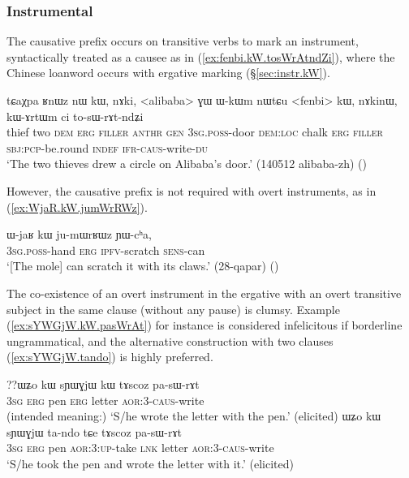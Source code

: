 \subsubsection{Instrumental} \label{sec:sig.caus.instrumental}
The causative prefix occurs on transitive verbs to mark an instrument, syntactically treated as a causee as in (\ref{ex:fenbi.kW.tosWrAtndZi}), where the Chinese loanword  occurs with ergative marking (§\ref{sec:instr.kW}). 

\begin{exe}
\ex \label{ex:fenbi.kW.tosWrAtndZi}
\gll tɕaχpa ʁnɯz nɯ kɯ, nɤki, <alibaba> ɣɯ ɯ-kɯm nɯtɕu <fenbi> kɯ, nɤkinɯ, kɯ-ɤrtɯm ci to-sɯ-rɤt-ndʑi \\
thief two \textsc{dem} \textsc{erg} \textsc{filler}  \textsc{anthr} \textsc{gen} \textsc{3sg}.\textsc{poss}-door \textsc{dem}:\textsc{loc} chalk \textsc{erg} \textsc{filler} \textsc{sbj}:\textsc{pcp}-be.round \textsc{indef} \textsc{ifr}-\textsc{caus}-write-\textsc{du} \\
\glt `The two thieves drew a circle on Alibaba's door.' (140512 alibaba-zh)
()
\end{exe}

However, the causative prefix is not required with overt instruments, as in (\ref{ex:WjaR.kW.jumWrRWz}).

\begin{exe}
\ex \label{ex:WjaR.kW.jumWrRWz}
\gll ɯ-jaʁ kɯ ju-mɯrʁɯz ɲɯ-cʰa, \\
\textsc{3sg}.\textsc{poss}-hand \textsc{erg} \textsc{ipfv}-scratch \textsc{sens}-can \\
\glt `[The mole] can scratch it with its claws.' (28-qapar)
()
\end{exe}

The co-existence of an overt instrument in the ergative with an overt transitive subject in the same clause (without any pause) is clumsy. Example (\ref{ex:sYWGjW.kW.pasWrAt}) for instance is considered infelicitous if borderline ungrammatical, and the alternative construction with two clauses (\ref{ex:sYWGjW.tando}) is highly preferred.

\begin{exe}
\ex 
\begin{xlist}
\ex \label{ex:sYWGjW.kW.pasWrAt}
\gll ??ɯʑo kɯ sɲɯɣjɯ kɯ tɤscoz pa-sɯ-rɤt \\
\textsc{3sg} \textsc{erg} pen \textsc{erg} letter \textsc{aor}:3\flobv{}-\textsc{caus}-write \\
\glt (intended meaning:) `S/he wrote the letter with the pen.' (elicited)
\ex \label{ex:sYWGjW.tando}
\gll ɯʑo kɯ sɲɯɣjɯ ta-ndo tɕe tɤscoz pa-sɯ-rɤt\\
\textsc{3sg} \textsc{erg} pen \textsc{aor}:3\flobv{}:\textsc{up}-take \textsc{lnk} letter \textsc{aor}:3\flobv{}-\textsc{caus}-write\\
\glt `S/he took the pen and wrote the letter with it.' (elicited)
\end{xlist}
\end{exe}

